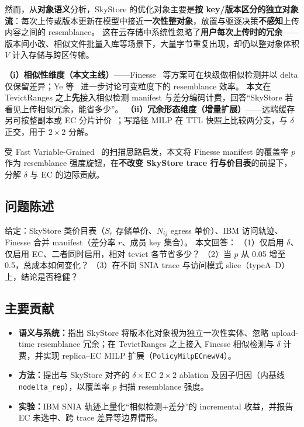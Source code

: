 \documentclass[conference]{IEEEtran}
\begin{document}
然而，从\textbf{对象语义}分析，SkyStore 的优化对象主要是\textbf{按 key/版本区分的独立对象流}：每次上传或版本更新在模型中接近\textbf{一次性整对象}，放置与驱逐决策\textbf{不感知}上传内容之间的 resemblance。
这在云存储中系统性忽略了\textbf{用户每次上传时的冗余}——版本间小改、相似文件批量入库等场景下，大量字节重复出现，却仍以整对象体积 $V$ 计入存储与跨区传输。

\textbf{（i）相似性维度（本文主线）}——Finesse~\cite{finesse} 等方案可在块级做相似检测并以 delta 仅保留差异；Ye 等~\cite{ye2021fast} 进一步讨论可变粒度下的 resemblance 效率。
本文在 TevictRanges 之上\textbf{先}接入相似检测 manifest 与差分编码计费，回答``SkyStore 若看见上传相似冗余，能省多少''。
\textbf{（ii）冗余形态维度（增量扩展）}——远端缓存另可按整副本或 EC 分片计价~\cite{azure_ec2012,plank2013}；写路径 MILP 在 TTL 快照上比较两分支，与 $\delta$ 正交，用于 $2{\times}2$ 分解。

受 Fast Variable-Grained~\cite{ye2021fast} 的扫描思路启发，本文将 Finesse manifest 的覆盖率 $p$ 作为 resemblance 强度旋钮，在\textbf{不改变 SkyStore trace 行与价目表}的前提下，分解 $\delta$ 与 EC 的边际贡献。

\subsection{问题陈述}

给定：SkyStore 类价目表（$S_r$ 存储单价、$N_{ij}$ egress 单价）、IBM 访问轨迹、Finesse 合并 manifest（差分率 $r$、成员 key 集合）。
本文回答：
（1）仅启用 $\delta$、仅启用 EC、二者同时启用，相对 tevict 各节省多少？
（2）当 $p$ 从 0.05 增至 0.5，总成本如何变化？
（3）在不同 SNIA trace 与访问模式 slice（typeA--D）上，结论是否稳健？

\subsection{主要贡献}

\begin{itemize}
  \item \textbf{语义与系统：}指出 SkyStore 将版本化对象视为独立一次性实体、忽略 upload-time resemblance 冗余；在 TevictRanges 之上接入 Finesse 相似检测与 $\delta$ 计费，并实现 replica--EC MILP 扩展（\texttt{PolicyMilpECnewV4}）。
  \item \textbf{方法：}提出与 SkyStore 对齐的 $\delta{\times}\mathrm{EC}$ $2{\times}2$ ablation 及因子归因（内基线 \texttt{nodelta\_rep}），以覆盖率 $p$ 扫描 resemblance 强度。
  \item \textbf{实验：}IBM SNIA 轨迹上量化``相似检测+差分''的 incremental 收益，并报告 EC 未选中、跨 trace 差异等边界情形。
\end{itemize}
\end{document}
